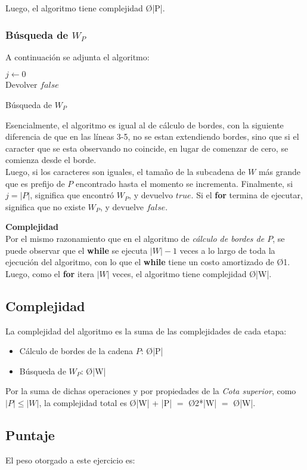 Luego, el algoritmo tiene complejidad \O{|P|}.\\
\strut\hfill\qedsymbol

\subsubsection{Búsqueda de $W_P$}
A continuación se adjunta el algoritmo:\\
\begin{algorithm}[H]
 \DontPrintSemicolon
 $j \gets 0$\\
 Devolver $false$
 \caption{Búsqueda de $W_P$}
\end{algorithm}

Esencialmente, el algoritmo es igual al de cálculo de bordes, con la siguiente diferencia de que en las líneas 3-5, no se estan extendiendo bordes, sino que si el caracter que se esta observando no coincide, en lugar de comenzar de cero, se comienza desde el borde.\\

Luego, si los caracteres son iguales, el tamaño de la subcadena de $W$ más grande que es prefijo de $P$ encontrado hasta el momento se incrementa.
Finalmente, si $j = |P|$, significa que encontró $W_P$, y devuelvo $true$. Si el \textbf{for} termina de ejecutar, significa que no existe $W_P$, y devuelve $false$.

\textbf{Complejidad}\\
Por el mismo razonamiento que en el algoritmo de \emph{cálculo de bordes de $P$}, se puede observar que el \textbf{while} se ejecuta $|W|-1$ veces a lo largo de toda la ejecución del algoritmo, con lo que el \textbf{while} tiene un costo amortizado de \O{1}. Luego, como el \textbf{for} itera $|W|$ veces, el algoritmo tiene complejidad \O{|W|}.

\subsection{Complejidad}
La complejidad del algoritmo es la suma de las complejidades de cada etapa:
\begin{itemize}
	\item Cálculo de bordes de la cadena $P$: \O{|P|}
	\item Búsqueda de $W_P$: \O{|W|}
\end{itemize}

Por la suma de dichas operaciones y por propiedades de la \emph{Cota superior}, como $|P| \leq |W|$, la complejidad total es \O{|W| + |P|} $ = $ \O{2*|W|} $=$ \O{|W|}.

\subsection{Puntaje}
El peso otorgado a este ejercicio es:
